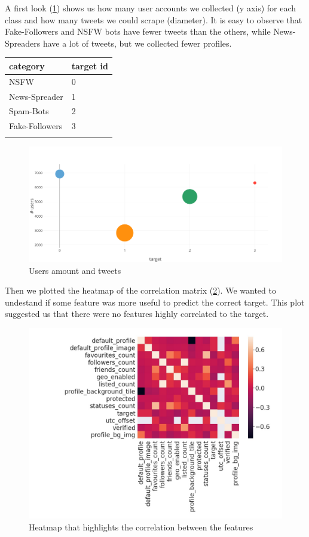 A first look (\ref{fig:bubble}) shows us how many user accounts we collected (y axis) for each class and how many tweets we could scrape (diameter). It is easy to observe that Fake-Followers and NSFW bots have fewer tweets than the others, while News-Spreaders have a lot of tweets, but we collected fewer profiles.
\begin{center}
	\begin{tabular}{ll}
		\\category&target id\\
		\hline\hline
		NSFW&0\\
		News-Spreader&1\\
		Spam-Bots&2\\
		Fake-Followers&3\\\hline\\		
	\end{tabular}
\end{center}


\begin{figure}[htp!]
	\centering
	\includegraphics[width=\columnwidth]{chapter3/figure/bubble.png}
	\caption{Users amount and tweets}
	\label{fig:bubble}
\end{figure}
\newpage
Then we plotted the heatmap of the correlation matrix (\ref{fig:heatmap}). We wanted to undestand if some feature was more useful to predict the correct target. This plot suggested us that there were no features highly correlated to the target.
\begin{figure}[htp!]
	\centering
	\includegraphics[width=\columnwidth]{chapter3/figure/heatmap.jpg}
	\caption{Heatmap that highlights the correlation between the features}
	\label{fig:heatmap}
\end{figure}

